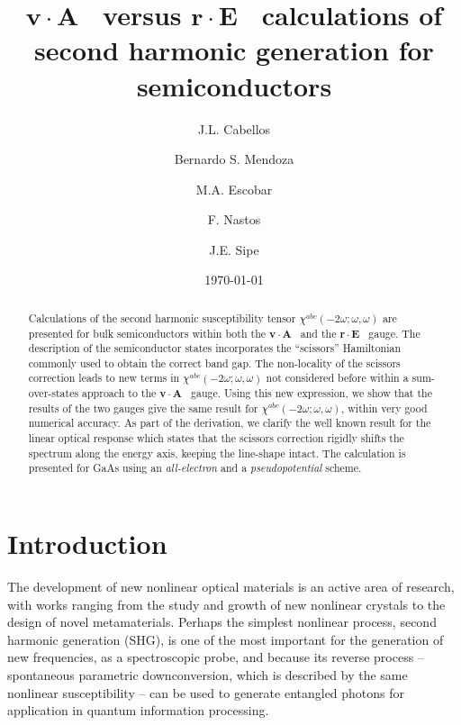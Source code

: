 \documentclass[floatfix,prb,aps,superscriptaddress,11pt]{revtex4}
\begin{document}
\title{$\mathbf{v}\cdot\mathbf{A}$~ versus $\mathbf{r}\cdot\mathbf{E}$~ calculations of second harmonic generation for semiconductors}
\author{J.L. Cabellos}
\author{Bernardo S. Mendoza}
\author{M.A. Escobar}
\author{F. Nastos}
\author{J.E. Sipe}
\date{\today}

\begin{abstract}
Calculations 
of the second harmonic susceptibility tensor
$\chi^{abc}(-2\omega;\omega,\omega)$
are presented for 
bulk semiconductors within both the $\mathbf{v}\cdot\mathbf{A}$~ 
and the $\mathbf{r}\cdot\mathbf{E}$~ gauge. 
The description of the semiconductor states incorporates the ``scissors'' 
Hamiltonian commonly used to obtain the correct band gap.
The non-locality of the scissors correction leads to                               
new terms in $\chi^{abc}(-2\omega;\omega,\omega)$
not considered before within a sum-over-states                                    
approach to the $\mathbf{v}\cdot\mathbf{A}$~ gauge.
Using this new expression, we show that the results of the two gauges give 
the same result for $\chi^{abc}(-2\omega;\omega,\omega)$, within very
good numerical accuracy.
As part of the derivation, 
we clarify the well known result for the linear optical 
response which states that the scissors
correction rigidly shifts the spectrum along the energy axis, keeping the
line-shape intact. The calculation is presented for GaAs using an \textit{
all-electron} and a \textit{pseudopotential} scheme.
\end{abstract}

\maketitle


\section{Introduction}

The development of new nonlinear optical materials is an active area of
research, with works ranging from the study and growth of new nonlinear
crystals to the design of novel metamaterials. Perhaps the simplest
nonlinear process, second harmonic generation (SHG), is one of the most
important for the generation of new frequencies, as a spectroscopic probe,
and because its reverse process -- spontaneous parametric downconversion,
which is described by the same nonlinear susceptibility -- can be used to
generate entangled photons for application in quantum information
processing.
\end{document}
